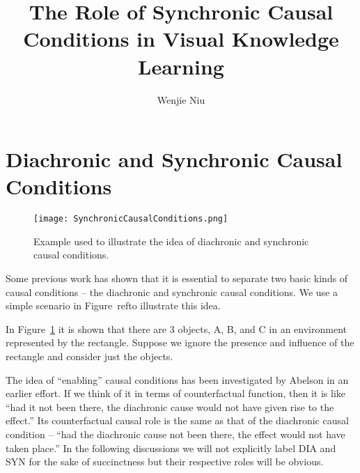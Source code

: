 \documentclass[twocolumn]{article}
\author{Wenjie Niu}
\title{The Role of Synchronic Causal Conditions in Visual Knowledge Learning}
\begin{document}
	\maketitle
	\par
\section{Diachronic and Synchronic Causal Conditions}
\begin{figure}[H]
\centering
 \texttt{[image: SynchronicCausalConditions.png]} 
 \caption{Example used to illustrate the idea of diachronic and
synchronic causal conditions.}  
 \label{fig:Conditions}
 \end{figure}
\cite{Ho_2017_CVPR_Workshops}Some previous work has shown that it is essential to separate two basic kinds of causal conditions – the diachronic and synchronic causal conditions. We use a simple scenario in Figure~ref{}to illustrate this idea. \par
In Figure~\ref{fig:Conditions} it is shown that there are 3 objects, A, B, and C in an environment represented by the rectangle. Suppose we ignore the presence and influence of the rectangle and consider just the objects. \par
The idea of “enabling” causal
conditions has been investigated by Abelson in an earlier effort. If we think of it in terms of counterfactual function, then it is like “had it not been there, the diachronic cause would not have given rise to the effect.” Its counterfactual causal role is the same as that of the diachronic causal condition – “had the diachronic cause not been there, the effect would not have taken place.” In the following discussions we will not explicitly label DIA and SYN for the sake of succinctness but their respective
roles will be obvious.\par

\end{document}

